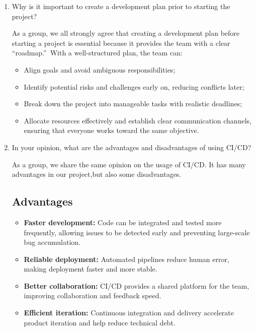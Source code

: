 \documentclass{article}
\begin{document}
\begin{enumerate}
    \item Why is it important to create a development plan prior to starting the
    project?

 As a group, we all strongly agree that creating a development plan before starting a project is essential because it provides the team with a clear \textquotedblleft roadmap.\textquotedblright\ With a well-structured plan, the team can:
\begin{itemize}
    \item Align goals and avoid ambiguous responsibilities;
    \item Identify potential risks and challenges early on, reducing conflicts later;
    \item Break down the project into manageable tasks with realistic deadlines;
    \item Allocate resources effectively and establish clear communication channels, ensuring that everyone works toward the same objective.
\end{itemize}
    \item In your opinion, what are the advantages and disadvantages of using
    CI/CD?
    
    As a group, we share the same opinion on the usage of CI/CD. It has many advantages in our project,but also some disadvantages.
\subsection*{Advantages}
\begin{itemize}
    \item \textbf{Faster development:} Code can be integrated and tested more frequently, allowing issues to be detected early and preventing large-scale bug accumulation.
    \item \textbf{Reliable deployment:} Automated pipelines reduce human error, making deployment faster and more stable.
    \item \textbf{Better collaboration:} CI/CD provides a shared platform for the team, improving collaboration and feedback speed.
    \item \textbf{Efficient iteration:} Continuous integration and delivery accelerate product iteration and help reduce technical debt.
\end{itemize}


\end{enumerate}
\end{document}
